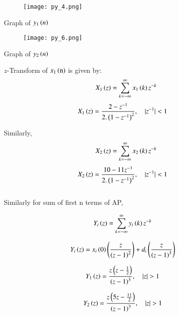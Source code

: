 \documentclass[beamer]{IEEEtran}
\theoremstyle{remark}
\begin{document}
\begin{figure}[h]
    \centering
    \texttt{[image: py\_4.png]}
    \label{fig:s1n}
\end{figure}
\begin{center}
    Graph of $y_1\left(n\right)$\\[3ex]
\end{center}
\begin{figure}[h]
    \centering
    \texttt{[image: py\_6.png]}
    \label{s2n}
\end{figure}
\begin{center}
Graph of $y_2\left(n\right)$\\[5ex]
\end{center}

$z$-Transform of $x_1\left(\text{n}\right)$ is given by:\\
\begin{align}
X_1\left(z\right)&=\sum_{k=-\infty}^{\infty} x_1\left(k\right)z^{-k}\\
\end{align}
\begin{align} X_1\left(z\right)&=\frac{2-z^{-1}}{2.\left(1-z^{-1}\right)^2},\quad |z^{-1}|<1
\end{align}

Similarly,
\begin{align}
X_2\left(z\right)&=\sum_{k=-\infty}^{\infty} x_2\left(k\right)z^{-k}\\
\end{align}
\begin{align}X_2\left(z\right)&=\frac{10-11z^{-1}}{2.\left(1-z^{-1}\right)^2},\quad |z^{-1}|<1 \end{align}\\[1ex]

Similarly for sum of first n terms of AP,

\begin{align}
Y_i\left(z\right)&=\sum_{k=-\infty}^{\infty} y_i\left(k\right)z^{-k}
\end{align}

\begin{align}
\label{w1}
Y_i\left(z\right)&=x_i\left(0\right)\left(\frac{z}{\left(z-1\right)^2}\right)+d_i\left(\frac{z}{\left(z-1\right)^3}\right)
\end{align}

\begin{align}
Y_1\brak{z}&=\frac{z\brak{z-\frac{1}{2}}}{\brak{z-1}^3},\quad |z|>1
\end{align}

\begin{align}Y_2\brak{z}&=\frac{z\brak{5z-\frac{11}{2}}}{\brak{z-1}^3},\quad |z|>1\end{align}\\
\end{document}
